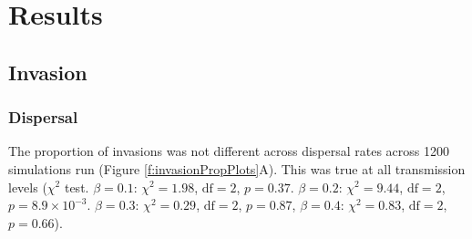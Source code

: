 





\section{Results}









































\subsection{Invasion}


\subsubsection{Dispersal}


The proportion of invasions was not different across dispersal rates across 1200 simulations run (Figure \ref{f:invasionPropPlots}A).
This was true at all transmission levels ($\chi^2$ test. $\beta = 0.1$: $\chi^2 = 1.98$, $\text{df} = 2$, $p = 0.37$. $\beta = 0.2$: $\chi^2 = 9.44$, $\text{df} = 2$, $p = \ensuremath{8.9\times 10^{-3}}$. $\beta = 0.3$: $\chi^2 = 0.29$, $\text{df} = 2$, $p = 0.87$, $\beta = 0.4$: $\chi^2 = 0.83$, $\text{df} = 2$, $p = 0.66$).


